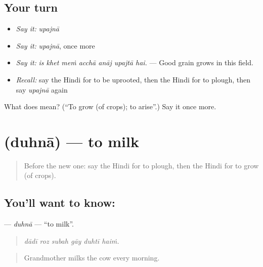 \subsection*{Your turn}
\begin{itemize}
\raggedright
  \item \emph{Say it:} \emph{upajnā}
  \item \emph{Say it:} \emph{upajnā}, once more
  \item \emph{Say it:} \emph{is khet meṁ acchā anāj upajtā hai.} — Good grain grows in this field.
  \item \emph{Recall:} say the Hindi for to be uprooted, then the Hindi for to plough, then say \emph{upajnā} again
\end{itemize}

\begin{tcolorbox}[breakable,colback=teal!4,colframe=teal!35!black,title={Before you move on}]
What does  mean? (\textquotedblleft{}To grow (of crops); to arise\textquotedblright{}.) Say it once more.
\end{tcolorbox}
\section[\texorpdfstring{\hi{दुहना} (duhnā)}{दुहना (duhnā)}]{ (duhnā) — to milk}

\label{lesson:HI-C450-duhna}



\begin{quote}
Before the new one: say the Hindi for to plough, then the Hindi for to grow (of crops).
\end{quote}

\subsection*{You'll want to know: }
\textbf{} — \emph{duhnā} — \textquotedblleft{}to milk\textquotedblright{}.

\begin{quote}
     
\end{quote}

\begin{quote}
\emph{dādī roz subah gāy duhtī haiṁ.}
\end{quote}

\begin{quote}
Grandmother milks the cow every morning.
\end{quote}

